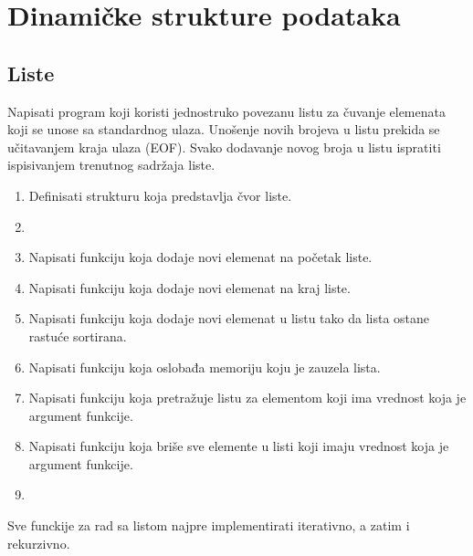 
\chapter{Dinamičke strukture podataka}

\section{Liste}

\begin{Exercise}[label=601]
Napisati program koji koristi jednostruko povezanu listu za čuvanje elemenata koji se unose sa standardnog ulaza. Unošenje novih brojeva u listu prekida se učitavanjem kraja ulaza (EOF). Svako dodavanje novog broja u listu ispratiti ispisivanjem trenutnog sadržaja liste. 
\begin{enumerate}
\item Definisati strukturu  koja predstavlja čvor liste.
\item {}

 \item Napisati funkciju koja dodaje novi elemenat na početak liste.
 \item Napisati funkciju koja dodaje novi elemenat na kraj liste.
 \item {} Napisati funkciju koja dodaje novi elemenat u listu tako da lista ostane rastuće sortirana.
 \item Napisati funkciju koja oslobađa memoriju koju je zauzela lista.
 \item {} Napisati funkciju koja pretražuje listu za elementom koji ima vrednost koja je argument funkcije.
 \item Napisati funkciju koja briše sve elemente u listi koji imaju vrednost koja je argument funkcije.
 \item {}
 \end{enumerate}
Sve funckije za rad sa listom najpre implementirati iterativno, a zatim i rekurzivno.
\end{Exercise}
\begin{Answer}[ref=601]
\end{Answer}


